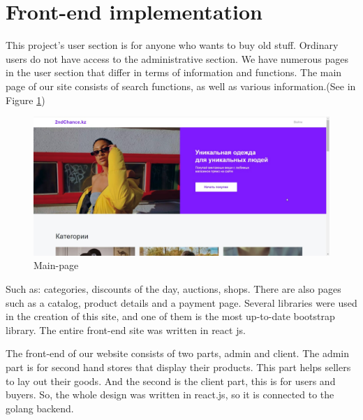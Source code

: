 \section{Front-end implementation}
This project's user section is for anyone who wants to buy old stuff. Ordinary users do not have access to the administrative section. We have numerous pages in the user section that differ in terms of information and functions. The main page of our site consists of search functions, as well as various information.(See in Figure \ref{fig:front-end})
\begin{figure}[h!]
    \centering
    \includegraphics[scale=0.6]{figures/front-end.jpg}
    \caption{Main-page}
    \label{fig:front-end}
\end{figure}

Such as: categories, discounts of the day, auctions, shops. There are also pages such as a catalog, product details and a payment page. Several libraries were used in the creation of this site, and one of them is the most up-to-date bootstrap library. The entire front-end site was written in react js.

The front-end of our website consists of two parts, admin and client. The admin part is for second hand stores that display their products. This part helps sellers to lay out their goods. And the second is the client part, this is for users and buyers. So, the whole design was written in react.js, so it is connected to the golang backend.
